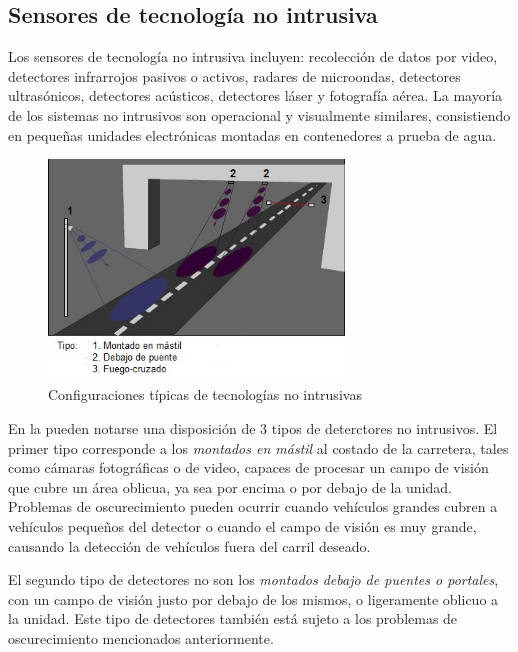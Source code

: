 \subsection{Sensores de tecnología no intrusiva}

Los sensores de tecnología no intrusiva incluyen:  recolección de datos por video, detectores infrarrojos pasivos o activos, radares de microondas, detectores ultrasónicos, detectores acústicos, detectores láser y fotografía aérea. La mayoría de los sistemas no intrusivos son operacional y visualmente similares, consistiendo en pequeñas unidades electrónicas montadas en contenedores a prueba de agua.

\begin{figure}[h]
	\centering
	\includegraphics[width=0.7\textwidth]{capitulos/3/figuras/figura3.jpg}
	\caption{\label{fig:noIntrusica}  Configuraciones típicas de tecnologías no intrusivas}	
\end{figure}

En la  pueden notarse una disposición de 3 tipos de deterctores no intrusivos. El primer tipo corresponde a los \emph{montados en mástil} al costado de la carretera, tales como cámaras fotográficas o de video, capaces de procesar un campo de visión que cubre un área oblicua, ya sea por encima o por debajo de la unidad.  Problemas de oscurecimiento pueden ocurrir cuando vehículos grandes cubren a vehículos pequeños del detector o cuando el campo de visión es muy grande, causando la detección de vehículos fuera del carril deseado.

El segundo tipo de detectores no son los \emph{montados debajo de puentes o portales}, con un campo de visión justo por debajo de los mismos, o ligeramente oblicuo a la unidad. Este tipo de detectores también está sujeto a los problemas de oscurecimiento mencionados anteriormente.

